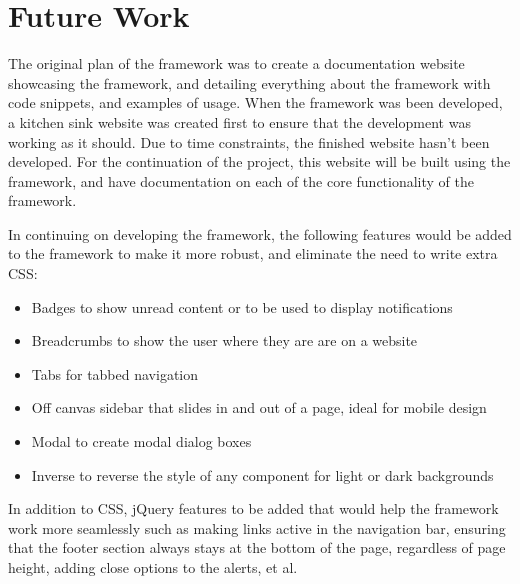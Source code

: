 \newpage
\chapter*{Future Work}



The original plan of the framework was to create a documentation website showcasing the framework, and detailing everything about the framework with code snippets, and examples of usage. When the framework was been developed, a kitchen sink website was created first to ensure that the development was working as it should. Due to time constraints, the finished website hasn't been developed. For the continuation of the project, this website will be built using the framework, and have documentation on each of the core functionality of the framework. 

In continuing on developing the framework, the following features would be added to the framework to make it more robust, and eliminate the need to write extra CSS:
\begin{itemize}
	\item Badges to show unread content or to be used to display notifications
	\item Breadcrumbs to show the user where they are are on a website
	\item Tabs for tabbed navigation
	\item Off canvas sidebar that slides in and out of a page, ideal for mobile design
	\item Modal to create modal dialog boxes
	\item Inverse to reverse the style of any component for light or dark backgrounds
\end{itemize}

In addition to CSS, jQuery features to be added that would help the framework work more seamlessly such as making links active in the navigation bar, ensuring that the footer section always stays at the bottom of the page, regardless of page height, adding close options to the alerts, et al. 

%
%

